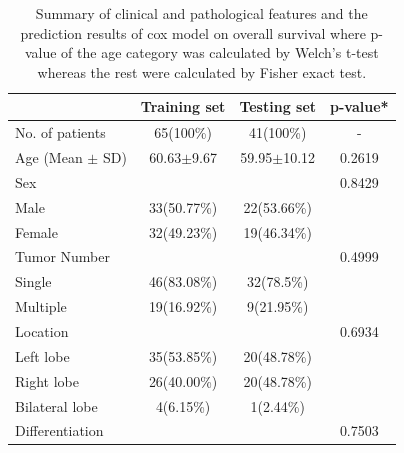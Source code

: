 \documentclass[num-refs]{wiley-article}
\begin{document}
\begin{table}[]
\footnotesize
\begin{center}
\caption{Summary of clinical and pathological features and the prediction results of cox model on overall survival where p-value of the age category was calculated by Welch’s t-test whereas the rest were calculated by Fisher exact test.}
\begin{tabular}{|l|c|c|c|}
\hline
                                               & Training set & Testing set & p-value*                \\ \hline
No. of patients                                & 65(100\%)    & 41(100\%)   & -                       \\ \hline
Age (Mean $\pm$ SD)                                & 60.63$\pm$9.67   & 59.95$\pm$10.12 & 0.2619                  \\ \hline
Sex                                            &              &             & 0.8429 \\ \cline{1-3}
\quad Male                                           & 33(50.77\%)  & 22(53.66\%) &                         \\ \cline{1-3}
\quad Female                                         & 32(49.23\%)  & 19(46.34\%) &                         \\ \hline
Tumor Number                                   &              &             & 0.4999 \\ \cline{1-3}
\quad Single                                         & 46(83.08\%)  & 32(78.5\%)  &                         \\ \cline{1-3}
\quad Multiple                                       & 19(16.92\%)  & 9(21.95\%)  &                         \\ \hline
Location                                       &              &             & 0.6934 \\ \cline{1-3}
\quad Left lobe                                      & 35(53.85\%)  & 20(48.78\%) &                         \\ \cline{1-3}
\quad Right lobe                                     & 26(40.00\%)  & 20(48.78\%) &                         \\ \hline
\quad Bilateral lobe                                 & 4(6.15\%)    & 1(2.44\%)   &                         \\ \hline
Differentiation                                &              &             & 0.7503 \\ \cline{1-3}

\end{tabular}
\end{center}
\end{table}
\end{document}
